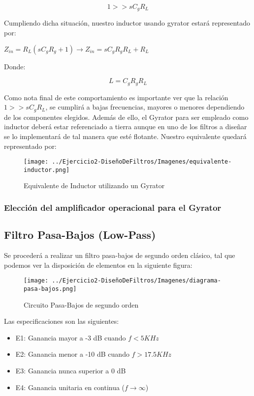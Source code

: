 $$1 >> sC_gR_L$$

Cumpliendo dicha situación, nuestro inductor usando gyrator estará representado por:

$Z_{in}=R_L(sC_gR_g+1)\longrightarrow Z_{in}=sC_gR_gR_L+R_L$

Donde:

$$L=C_gR_gR_L$$

Como nota final de este comportamiento es importante ver que la relación $1 >> sC_gR_L$, se cumplirá a bajas frecuencias,
mayores o menores dependiendo de los componentes elegidos. Además de ello, el Gyrator para ser empleado como inductor deberá estar
referenciado a tierra aunque en uno de los filtros a diseñar se lo implementará de tal manera que esté flotante.
Nuestro equivalente quedará representado por:

\begin{figure}[H]
    \centering
    \texttt{[image: ../Ejercicio2-DiseñoDeFiltros/Imagenes/equivalente-inductor.png]}
    \caption{Equivalente de Inductor utilizando un Gyrator}
\end{figure}

\subsubsection{Elección del amplificador operacional para el Gyrator}


\subsection{Filtro Pasa-Bajos (Low-Pass)}

Se procederá a realizar un filtro pasa-bajos de segundo orden clásico, tal que podemos
ver la disposición de elementos en la siguiente figura:

\begin{figure}[H]
    \centering
    \texttt{[image: ../Ejercicio2-DiseñoDeFiltros/Imagenes/diagrama-pasa-bajos.png]}
    \caption{Circuito Pasa-Bajos de segundo orden}
\end{figure}

Las especificaciones son las siguientes:

\begin{itemize}
	\item E1: Ganancia mayor a -3 dB cuando $f < 5 KHz$ 
	\item E2: Ganancia menor a -10 dB cuando $f > 17.5 KHz $
	\item E3: Ganancia nunca superior a 0 dB
	\item E4: Ganancia unitaria en continua ($f \to \infty$)
\end{itemize}

